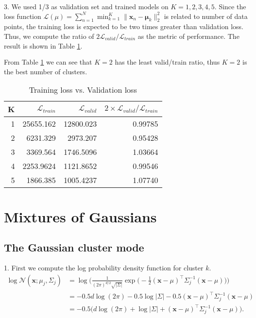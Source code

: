 \documentclass[12pt]{article}
\begin{document}
3. We used 1/3 as validation set and trained models on $K=1,2,3,4,5$. Since the loss function $\mathcal{L}(\mu) = \sum_{n=1}^N \min_{k=1}^K \lVert \mathbf{x}_n - \mathbf{\mu}_k \rVert _2^2$ is related to number of data points, the training loss is expected to be two times greater than validation loss. Thus, we compute the ratio of $2 \mathcal{L}_{valid} / \mathcal{L}_{train}$ as the metric of performance. The result is shown in Table \ref{table:a3-1.1-3}.

From Table \ref{table:a3-1.1-3} we can see that $K=2$ has the least valid/train ratio, thus $K=2$ is the best number of clusters.

\begin{table}[!htb]
\centering
\begin{tabular}{r|r|r|r}
\hline
 K & $\mathcal{L}_{train}$ & $\mathcal{L}_{valid}$ & $2 \times \mathcal{L}_{valid} / \mathcal{L}_{train}$ \\ \hline
1 & 25655.162 & 12800.023 & 0.99785 \\
2 & 6231.329 & 2973.207 & 0.95428 \\
3 & 3369.564 & 1746.5096 & 1.03664 \\
4 & 2253.9624 & 1121.8652 & 0.99546 \\
5 & 1866.385 & 1005.4237 & 1.07740 \\ \hline
\end{tabular}
\caption{Training loss vs. Validation loss}
\label{table:a3-1.1-3}
\end{table}

\section{Mixtures of Gaussians}

\subsection{The Gaussian cluster mode}

1. First we compute the log probability density function for cluster $k$.
\begin{align*}
\log\mathcal{N}(\mathbf{x}; \mu_j, \Sigma_j) &= \log\Big(\frac{1}{(2\pi)^{d/2} \sqrt{|\Sigma|}}
    \exp\big(-\frac{1}{2}(\mathbf{x} - \mu)^\intercal \Sigma_j^{-1} (\mathbf{x} - \mu)\big)\Big) \\
&= -0.5d\log(2\pi) -0.5\log|\Sigma| -0.5 (\mathbf{x} - \mu)^\intercal \Sigma_j^{-1} (\mathbf{x} - \mu) \\
&= -0.5 \big( d\log(2\pi) + \log|\Sigma| + (\mathbf{x} - \mu)^\intercal \Sigma_j^{-1} (\mathbf{x} - \mu) \big).
\end{align*}
\end{document}
